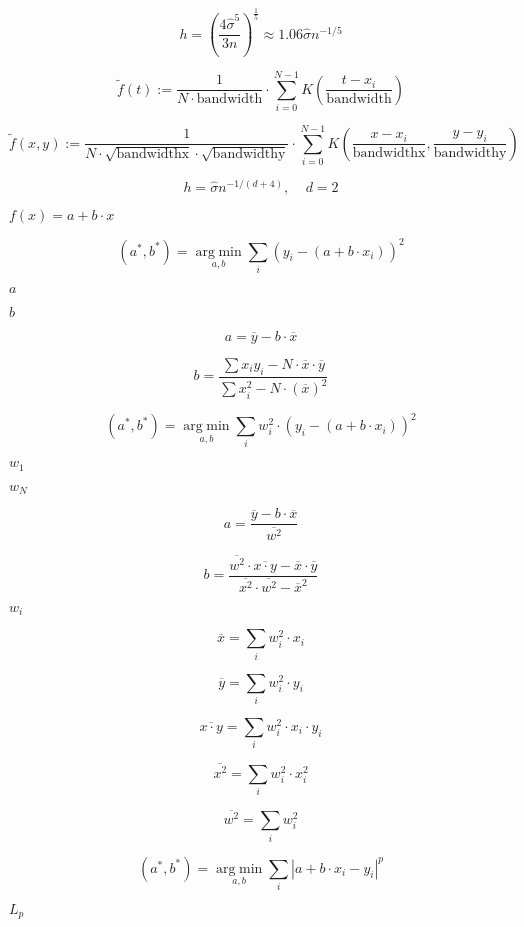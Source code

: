 \documentclass{article}
\begin{document}
\[ h = \left(\frac{4\hat{\sigma}^5}{3n}\right)^{\frac{1}{5}} \approx 1.06 \hat{\sigma} n^{-1/5} \]
\pagebreak

\[ \tilde{f}(t):=\frac{1}{N\cdot\text{bandwidth}}\cdot\sum\limits_{i=0}^{N-1}K\left(\frac{t-x_i}{\text{bandwidth}}\right) \]
\pagebreak

\[ \tilde{f}(x,y):=\frac{1}{N\cdot\sqrt{\text{bandwidthx}}\cdot\sqrt{\text{bandwidthy}}}\cdot\sum\limits_{i=0}^{N-1}K\left(\frac{x-x_i}{\text{bandwidthx}},\frac{y-y_i}{\text{bandwidthy}}\right) \]
\pagebreak

\[ h = \hat{\sigma} n^{-1/(d+4)},\ \ \ \ \ d=2 \]
\pagebreak

$ f(x)=a+b\cdot x $
\pagebreak

\[ (a^\ast, b^\ast)=\mathop{\mathrm{arg\;min}}\limits_{a,b}\sum\limits_i\left(y_i-(a+b\cdot x_i)\right)^2 \]
\pagebreak

$ a $
\pagebreak

$ b $
\pagebreak

\[ a=\overline{y}-b\cdot\overline{x} \]
\pagebreak

\[ b=\frac{\sum x_iy_i-N\cdot\overline{x}\cdot\overline{y}}{\sum x_i^2-N\cdot(\overline{x})^2} \]
\pagebreak

\[ (a^\ast, b^\ast)=\mathop{\mathrm{arg\;min}}\limits_{a,b}\sum\limits_iw_i^2\cdot\left(y_i-(a+b\cdot x_i)\right)^2 \]
\pagebreak

$ w_1 $
\pagebreak

$ w_N $
\pagebreak

\[ a=\frac{\overline{y}-b\cdot\overline{x}}{\overline{w^2}} \]
\pagebreak

\[ b=\frac{\overline{w^2}\cdot\overline{x\cdot y}-\overline{x}\cdot\overline{y}}{\overline{x^2}\cdot\overline{w^2}-\overline{x}^2} \]
\pagebreak

$ w_i$
\pagebreak

\[ \overline{x}=\sum\limits_iw_i^2\cdot x_i \]
\pagebreak

\[ \overline{y}=\sum\limits_iw_i^2\cdot y_i \]
\pagebreak

\[ \overline{x\cdot y}=\sum\limits_iw_i^2\cdot x_i\cdot y_i \]
\pagebreak

\[ \overline{x^2}=\sum\limits_iw_i^2\cdot x_i^2 \]
\pagebreak

\[ \overline{w^2}=\sum\limits_iw_i^2 \]
\pagebreak

\[ (a^\ast,b^\ast)=\mathop{\mathrm{arg\;min}}\limits_{a,b}\sum\limits_i|a+b\cdot x_i-y_i|^p \]
\pagebreak

$ L_p $
\pagebreak
\end{document}
